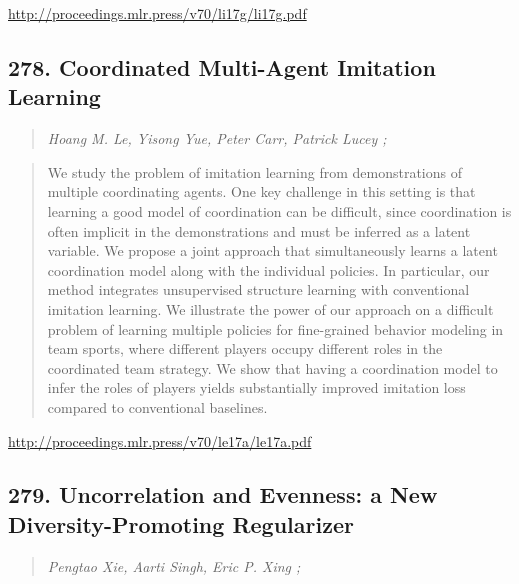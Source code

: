 \documentclass{article}
\begin{document}
\href{http://proceedings.mlr.press/v70/li17g/li17g.pdf}{http://proceedings.mlr.press/v70/li17g/li17g.pdf}

\subsection{278. Coordinated Multi-Agent Imitation Learning}

\begin{quote}
\footnotesize{\textit{Hoang M. Le, Yisong Yue, Peter Carr, Patrick Lucey ;}}

\end{quote}

\begin{quote}
    We study the problem of imitation learning from demonstrations of multiple coordinating agents. One key challenge in this setting is that learning a good model of coordination can be difficult, since coordination is often implicit in the demonstrations and must be inferred as a latent variable. We propose a joint approach that simultaneously learns a latent coordination model along with the individual policies. In particular, our method integrates unsupervised structure learning with conventional imitation learning. We illustrate the power of our approach on a difficult problem of learning multiple policies for fine-grained behavior modeling in team sports, where different players occupy different roles in the coordinated team strategy. We show that having a coordination model to infer the roles of players yields substantially improved imitation loss compared to conventional baselines.  
\end{quote}

\href{http://proceedings.mlr.press/v70/le17a/le17a.pdf}{http://proceedings.mlr.press/v70/le17a/le17a.pdf}

\subsection{279. Uncorrelation and Evenness: a New Diversity-Promoting Regularizer}

\begin{quote}
\footnotesize{\textit{Pengtao Xie, Aarti Singh, Eric P. Xing ;}}

\end{quote}
\end{document}
